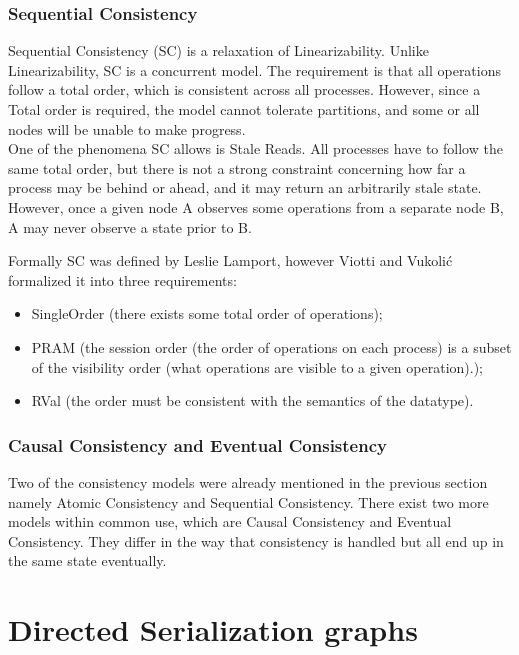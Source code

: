 \documentclass[a4paper,10pt,titlepage]{report}
\begin{document}
\subsubsection{Sequential Consistency}
Sequential Consistency (SC) is a relaxation of Linearizability. Unlike Linearizability, SC is a concurrent model. The requirement is that all operations follow a total order, which is consistent across all processes. However, since a Total order is required, the model cannot tolerate partitions, and some or all nodes will be unable to make progress. 
\\ \vspace{5mm}
One of the phenomena SC allows is Stale Reads. All processes have to follow the same total order, but there is not a strong constraint concerning how far a process may be behind or ahead, and it may return an arbitrarily stale state. However, once a given node A observes some operations from a separate node B, A may never observe a state prior to B.

Formally SC was defined by Leslie Lamport\cite{Lamport1979how}, however Viotti and Vukolić\cite{ConsistencyinNonTransactionalDistributedStorageSystems} formalized it into three requirements:
\begin{itemize}
    \item SingleOrder (there exists some total order of operations);
    \item PRAM (the session order (the order of operations on each process) is a subset of the visibility order (what operations are visible to a given operation).);
    \item RVal (the order must be consistent with the semantics of the datatype).
\end{itemize}

\subsubsection{Causal Consistency and Eventual Consistency}
Two of the consistency models were already mentioned in the previous section namely Atomic Consistency and Sequential Consistency. There exist two more models within common use, which are Causal Consistency and Eventual Consistency. They differ in the way that consistency is handled but all end up in the same state eventually.


\newpage
\section{Directed Serialization graphs}
\end{document}
